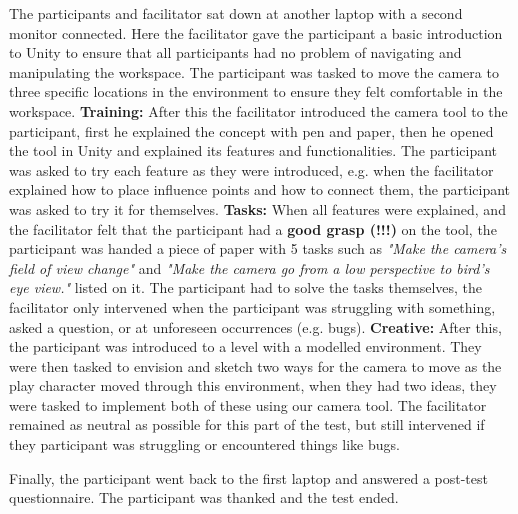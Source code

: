 The participants and facilitator sat down at another laptop with a second monitor connected. Here the facilitator gave the participant a basic introduction to Unity to ensure that all participants had no problem of navigating and manipulating the workspace. The participant was tasked to move the camera to three specific locations in the environment to ensure they felt comfortable in the workspace. \textbf{Training:} After this the facilitator introduced the camera tool to the participant, first he explained the concept with pen and paper, then he opened the tool in Unity and explained its features and functionalities. The participant was asked to try each feature as they were introduced, e.g. when the facilitator explained how to place influence points and how to connect them, the participant was asked to try it for themselves. \textbf{Tasks:} When all features were explained, and the facilitator felt that the participant had a \textbf{good grasp (!!!)} on the tool, the participant was handed a piece of paper with 5 tasks such as \textit{"Make the camera's field of view change"} and \textit{"Make the camera go from a low perspective to bird's eye view."} listed on it. The participant had to solve the tasks themselves, the facilitator only intervened when the participant was struggling with something, asked a question, or at unforeseen occurrences (e.g. bugs). \textbf{Creative:} After this, the participant was introduced to a level with a modelled environment. They were then tasked to envision and sketch two ways for the camera to move as the play character moved through this environment, when they had two ideas, they were tasked to implement both of these using our camera tool. The facilitator remained as neutral as possible for this part of the test, but still intervened if they participant was struggling or encountered things like bugs.

Finally, the participant went back to the first laptop and answered a post-test questionnaire. The participant was thanked and the test ended.